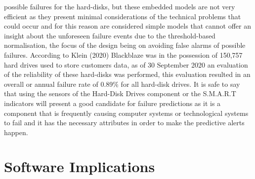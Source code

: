 possible failures for the hard-disks, but these embedded models are not very efficient as they present minimal
considerations of the technical problems that could occur and for this reason are considered simple models that
cannot offer an insight about the unforeseen failure events due to the threshold-based normalisation, the focus of
the design being on avoiding false alarms of possible failures. According to Klein (2020) Blackblaze was in the
possession of 150,757 hard drives used to store customers data, as of 30 September 2020 an evaluation of the
reliability of these hard-disks was performed, this evaluation resulted in an overall or annual failure rate
of 0.89\% for all hard-disk drives. It is safe to say that using the sensors of the Hard-Disk Drives
component or the S.M.A.R.T indicators will present a good candidate for failure predictions as it is a component
that is frequently causing computer systems or technological systems to fail and it has the necessary attributes
in order to make the predictive alerts happen.

\section{Software Implications}

